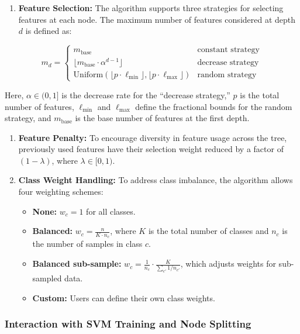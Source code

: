\begin{enumerate}
\def\labelenumi{\arabic{enumi}.}
\tightlist
\item
  \textbf{Feature Selection:} The algorithm supports three strategies for selecting features at each node. The maximum number of features considered at depth \(d\) is defined as:
\end{enumerate}

\[
m_d =
\begin{cases}
m_{\text{base}} & \text{constant strategy} \\
\lfloor m_{\text{base}} \cdot \alpha^{d-1} \rfloor & \text{decrease strategy} \\
\text{Uniform}(\lfloor p \cdot \ell_{\min} \rfloor, \lfloor p \cdot \ell_{\max} \rfloor) & \text{random strategy}
\end{cases}
\]

Here, \(\alpha \in (0, 1]\) is the decrease rate for the ``decrease strategy,'' \(p\) is the total number of features, \(\ell_{\min}\) and \(\ell_{\max}\) define the fractional bounds for the random strategy, and \(m_{\text{base}}\) is the base number of features at the first depth.

\begin{enumerate}
\def\labelenumi{\arabic{enumi}.}
\setcounter{enumi}{1}
\item
  \textbf{Feature Penalty:} To encourage diversity in feature usage across the tree, previously used features have their selection weight reduced by a factor of \((1 - \lambda)\), where \(\lambda \in [0, 1)\).
\item
  \textbf{Class Weight Handling:} To address class imbalance, the algorithm allows four weighting schemes:

  \begin{itemize}
  \item
    \textbf{None:} \(w_c = 1\) for all classes.
  \item
    \textbf{Balanced:} \(w_c = \frac{n}{K \cdot n_c}\), where \(K\) is the total number of classes and \(n_c\) is the number of samples in class \(c\).
  \item
    \textbf{Balanced sub-sample:} \(w_c = \frac{1}{n_c} \cdot \frac{K}{\sum_{c'} 1/n_{c'}}\), which adjusts weights for sub-sampled data.
  \item
    \textbf{Custom:} Users can define their own class weights.
  \end{itemize}
\end{enumerate}

\subsubsection{Interaction with SVM Training and Node Splitting}\label{interaction-with-svm-training-and-node-splitting}

